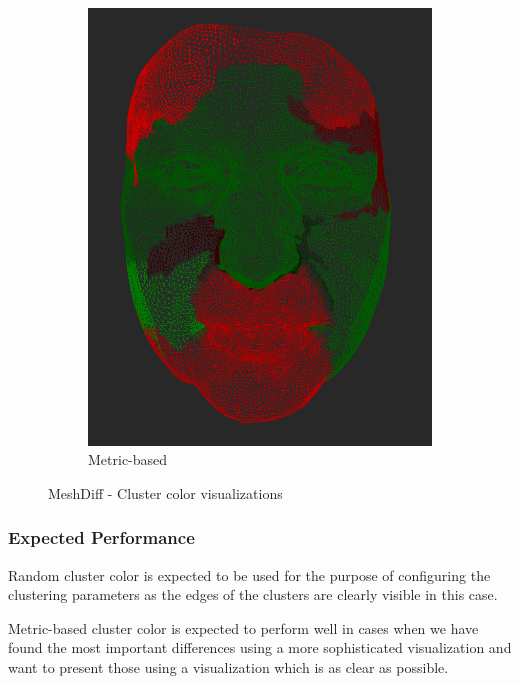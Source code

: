 \begin{figure}[h]
\begin{subfigure}{0.4\textwidth}
	\includegraphics[width=\textwidth]{./img/meshdiff-clustercolor-metric.PNG}
    \caption{Metric-based}
    \label{fig:meshdiff-clustercolor_metric}
	\end{subfigure}
    
\caption[MeshDiff - Cluster color visualizations]{MeshDiff - Cluster color visualizations}
\end{figure}

\subsubsection{Expected Performance}

Random cluster color is expected to be used for the purpose of configuring the clustering parameters as the edges of the clusters are clearly visible in this case.

Metric-based cluster color is expected to perform well in cases when we have found the most important differences using a more sophisticated visualization and want to present those using a visualization which is as clear as possible.
